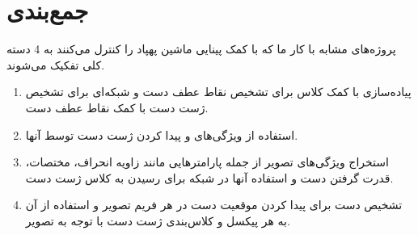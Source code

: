 \section{جمع‌بندی}
پروژه‌های مشابه با کار ما که با کمک پینایی ماشین پهپاد را کنترل می‌‌کنند به 4 دسته کلی تفکیک می‌شوند.
\begin{enumerate}
    \item  پیاده‌سازی با کمک کلاس  برای تشخیص نقاط عطف دست و شبکه‌ای برای تشخیص ژست دست با کمک نقاط عطف دست.
    \item استفاده از ویژگی‌های  و پیدا کردن ژست دست توسط آنها.
    \item استخراج ویژگی‌های تصویر از جمله پارامترهایی مانند زاویه انحراف، مختصات، قدرت گرفتن دست و استفاده آنها در شبکه برای رسیدن به کلاس ژست دست.
    \item تشخیص دست برای پیدا کردن موقعیت دست در هر فریم تصویر و استفاده از آن به هر پیکسل  و کلاس‌بندی ژست دست با توجه به تصویر.
\end{enumerate}